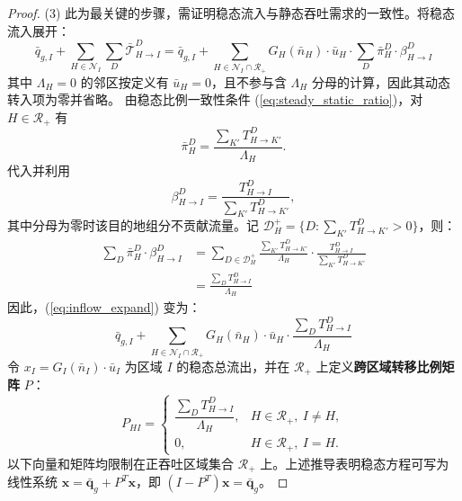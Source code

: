 \documentclass[a4paper,12pt]{article}
\theoremstyle{plain}
\theoremstyle{definition}
\theoremstyle{remark}
\begin{document}
\begin{proof}
(3) 此为最关键的步骤，需证明稳态流入与静态吞吐需求的一致性。将稳态流入展开：
\begin{equation}\label{eq:inflow_expand}
    \bar{q}_{g,I} + \sum_{H\in\mathcal N_I} \sum_D \bar{\mathcal{T}}_{H \to I}^D = \bar{q}_{g,I} + \sum_{H\in\mathcal N_I\cap\mathcal R_+} G_H(\bar{n}_H) \cdot \bar{u}_H \cdot \sum_D \bar\pi_H^D \cdot \beta_{H \to I}^D
\end{equation}
其中 $\Lambda_H=0$ 的邻区按定义有 $\bar u_H=0$，且不参与含 $\Lambda_H$ 分母的计算，因此其动态转入项为零并省略。
由稳态比例一致性条件 (\ref{eq:steady_static_ratio})，对 $H\in\mathcal R_+$ 有
\begin{equation}
    \bar\pi_H^D = \frac{\sum_{K'} T_{H \to K'}^D}{\Lambda_H}.
\end{equation}
代入并利用
\begin{equation}
    \beta_{H \to I}^D =
    \frac{T_{H \to I}^D}{\sum_{K'} T_{H \to K'}^D},
\end{equation}
其中分母为零时该目的地组分不贡献流量。记 $\mathcal D_H^+=\{D:\sum_{K'}T_{H\to K'}^D>0\}$，则：
\begin{equation}
\begin{aligned}
    \sum_D \bar\pi_H^D \cdot \beta_{H \to I}^D
    &= \sum_{D\in\mathcal D_H^+} \frac{\sum_{K'} T_{H \to K'}^D}{\Lambda_H} \cdot \frac{T_{H \to I}^D}{\sum_{K'} T_{H \to K'}^D} \\
    &= \frac{\sum_D T_{H \to I}^D}{\Lambda_H}
\end{aligned}
\end{equation}
因此，(\ref{eq:inflow_expand}) 变为：
\begin{equation}
    \bar{q}_{g,I} + \sum_{H\in\mathcal N_I\cap\mathcal R_+} G_H(\bar{n}_H) \cdot \bar{u}_H \cdot \frac{\sum_D T_{H \to I}^D}{\Lambda_H}
\end{equation}
令 $x_I = G_I(\bar{n}_I) \cdot \bar{u}_I$ 为区域 $I$ 的稳态总流出，并在 $\mathcal R_+$ 上定义\textbf{跨区域转移比例矩阵} $P$：
\begin{equation}\label{eq:transfer_matrix}
    P_{HI} =
    \begin{cases}
    \dfrac{\sum_D T_{H \to I}^D}{\Lambda_H}, & H\in\mathcal R_+,\ I\ne H,\\[1.0em]
    0, & H\in\mathcal R_+,\ I=H .
    \end{cases}
\end{equation}
以下向量和矩阵均限制在正吞吐区域集合 $\mathcal R_+$ 上。上述推导表明稳态方程可写为线性系统 $\bm{x} = \bar{\bm{q}}_g + P^T \bm{x}$，即 $(I - P^T)\bm{x} = \bar{\bm{q}}_g$。


\end{proof}
\end{document}
